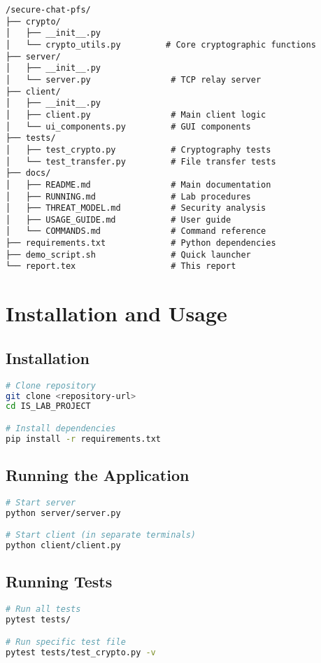 \documentclass[12pt,a4paper]{article}
\begin{document}
\begin{verbatim}
/secure-chat-pfs/
├── crypto/
│   ├── __init__.py
│   └── crypto_utils.py         # Core cryptographic functions
├── server/
│   ├── __init__.py
│   └── server.py                # TCP relay server
├── client/
│   ├── __init__.py
│   ├── client.py                # Main client logic
│   └── ui_components.py         # GUI components
├── tests/
│   ├── test_crypto.py           # Cryptography tests
│   └── test_transfer.py         # File transfer tests
├── docs/
│   ├── README.md                # Main documentation
│   ├── RUNNING.md               # Lab procedures
│   ├── THREAT_MODEL.md          # Security analysis
│   ├── USAGE_GUIDE.md           # User guide
│   └── COMMANDS.md              # Command reference
├── requirements.txt             # Python dependencies
├── demo_script.sh               # Quick launcher
└── report.tex                   # This report
\end{verbatim}

\section{Installation and Usage}

\subsection{Installation}
\begin{lstlisting}[language=bash]
# Clone repository
git clone <repository-url>
cd IS_LAB_PROJECT

# Install dependencies
pip install -r requirements.txt
\end{lstlisting}

\subsection{Running the Application}
\begin{lstlisting}[language=bash]
# Start server
python server/server.py

# Start client (in separate terminals)
python client/client.py
\end{lstlisting}

\subsection{Running Tests}
\begin{lstlisting}[language=bash]
# Run all tests
pytest tests/

# Run specific test file
pytest tests/test_crypto.py -v
\end{lstlisting}
\end{document}
